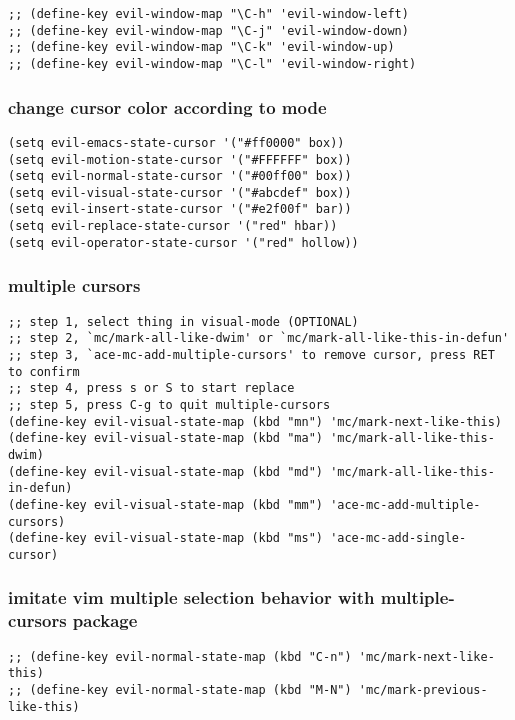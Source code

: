 \documentclass[11pt]{article}
\begin{document}
\begin{verbatim}
;; (define-key evil-window-map "\C-h" 'evil-window-left)
;; (define-key evil-window-map "\C-j" 'evil-window-down)
;; (define-key evil-window-map "\C-k" 'evil-window-up)
;; (define-key evil-window-map "\C-l" 'evil-window-right)
\end{verbatim}



\subsubsection*{change cursor color according to mode}
\label{sec:org50eed3a}

\begin{verbatim}
(setq evil-emacs-state-cursor '("#ff0000" box))
(setq evil-motion-state-cursor '("#FFFFFF" box))
(setq evil-normal-state-cursor '("#00ff00" box))
(setq evil-visual-state-cursor '("#abcdef" box))
(setq evil-insert-state-cursor '("#e2f00f" bar))
(setq evil-replace-state-cursor '("red" hbar))
(setq evil-operator-state-cursor '("red" hollow))
\end{verbatim}

\subsubsection*{multiple cursors}
\label{sec:orge056684}

\begin{verbatim}
;; step 1, select thing in visual-mode (OPTIONAL)
;; step 2, `mc/mark-all-like-dwim' or `mc/mark-all-like-this-in-defun'
;; step 3, `ace-mc-add-multiple-cursors' to remove cursor, press RET to confirm
;; step 4, press s or S to start replace
;; step 5, press C-g to quit multiple-cursors
(define-key evil-visual-state-map (kbd "mn") 'mc/mark-next-like-this)
(define-key evil-visual-state-map (kbd "ma") 'mc/mark-all-like-this-dwim)
(define-key evil-visual-state-map (kbd "md") 'mc/mark-all-like-this-in-defun)
(define-key evil-visual-state-map (kbd "mm") 'ace-mc-add-multiple-cursors)
(define-key evil-visual-state-map (kbd "ms") 'ace-mc-add-single-cursor)
\end{verbatim}

\subsubsection*{imitate vim multiple selection behavior with multiple-cursors package}
\label{sec:org887cbbe}
\begin{verbatim}
;; (define-key evil-normal-state-map (kbd "C-n") 'mc/mark-next-like-this)
;; (define-key evil-normal-state-map (kbd "M-N") 'mc/mark-previous-like-this)
\end{verbatim}
\end{document}
